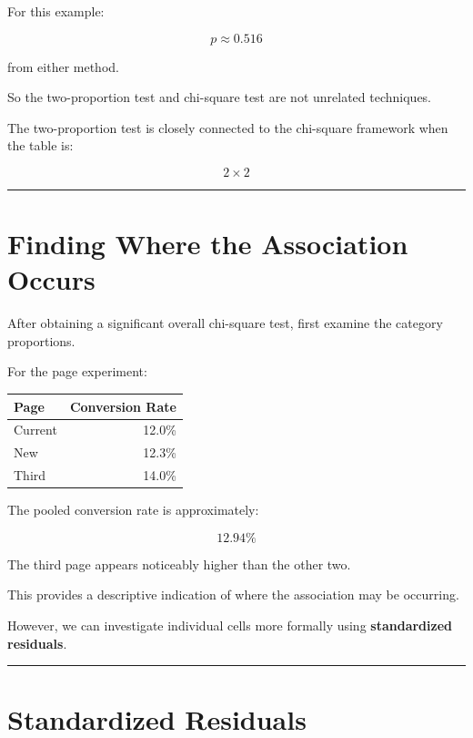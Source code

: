 \documentclass[
  letterpaper,
  DIV=11,
  numbers=noendperiod]{scrreprt}
\newcounter{none} %
\begin{document}
For this example:

\[
p\approx0.516
\]

from either method.

So the two-proportion test and chi-square test are not unrelated
techniques.

The two-proportion test is closely connected to the chi-square framework
when the table is:

\[
2\times2
\]

\begin{center}\rule{0.5\linewidth}{0.5pt}\end{center}


\chapter{Finding Where the Association
Occurs}\label{finding-where-the-association-occurs}

After obtaining a significant overall chi-square test, first examine the
category proportions.

For the page experiment:

{\def\LTcaptype{none} %
\begin{longtable}[]{@{}lr@{}}
\toprule\noalign{}
Page & Conversion Rate \\
\midrule\noalign{}
\endhead
\bottomrule\noalign{}
\endlastfoot
Current & 12.0\% \\
New & 12.3\% \\
Third & 14.0\% \\
\end{longtable}
}

The pooled conversion rate is approximately:

\[
12.94\%
\]

The third page appears noticeably higher than the other two.

This provides a descriptive indication of where the association may be
occurring.

However, we can investigate individual cells more formally using
\textbf{standardized residuals}.

\begin{center}\rule{0.5\linewidth}{0.5pt}\end{center}


\chapter{Standardized Residuals}\label{standardized-residuals}
\end{document}
